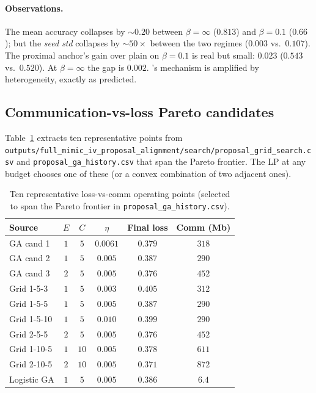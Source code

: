 \paragraph{Observations.}
The mean accuracy collapses by $\sim$$0.20$ between $\beta\!=\!\infty$
($0.813$) and $\beta\!=\!0.1$ ($0.66$); but the \emph{seed std}
collapses by $\sim$$50\!\times$ between the two regimes ($0.003$ vs.\
$0.107$). The proximal anchor's gain over plain \fedavg{} on
$\beta\!=\!0.1$ is real but small: $0.023$ \auprc{} ($0.543$ vs.\
$0.520$). At $\beta\!=\!\infty$ the gap is $0.002$. \fedprox{}'s
mechanism is amplified by heterogeneity, exactly as predicted.

\subsection{Communication-vs-loss Pareto candidates}

Table~\ref{tab:pareto-candidates} extracts ten representative
points from
\texttt{outputs/full\_mimic\_iv\_proposal\_alignment/search/proposal\_grid\_search.csv}
and \texttt{proposal\_ga\_history.csv} that span the Pareto
frontier. The LP at any budget chooses one of these (or a convex
combination of two adjacent ones).

\begin{table}[h]
\centering
\caption{Ten representative loss-vs-comm operating points (selected
to span the Pareto frontier in
\texttt{proposal\_ga\_history.csv}).}
\label{tab:pareto-candidates}
\small
\begin{tabular}{l c c c c c}
\toprule
Source & $E$ & $C$ & $\eta$ & Final loss & Comm (Mb) \\
\midrule
GA cand 1   & $1$ & $5$  & $0.0061$ & $0.379$ & $318$ \\
GA cand 2   & $1$ & $5$  & $0.005$  & $0.387$ & $290$ \\
GA cand 3   & $2$ & $5$  & $0.005$  & $0.376$ & $452$ \\
Grid 1-5-3  & $1$ & $5$  & $0.003$  & $0.405$ & $312$ \\
Grid 1-5-5  & $1$ & $5$  & $0.005$  & $0.387$ & $290$ \\
Grid 1-5-10 & $1$ & $5$  & $0.010$  & $0.399$ & $290$ \\
Grid 2-5-5  & $2$ & $5$  & $0.005$  & $0.376$ & $452$ \\
Grid 1-10-5 & $1$ & $10$ & $0.005$  & $0.378$ & $611$ \\
Grid 2-10-5 & $2$ & $10$ & $0.005$  & $0.371$ & $872$ \\
Logistic GA & $1$ & $5$  & $0.005$  & $0.386$ & $6.4$ \\
\bottomrule
\end{tabular}
\end{table}

